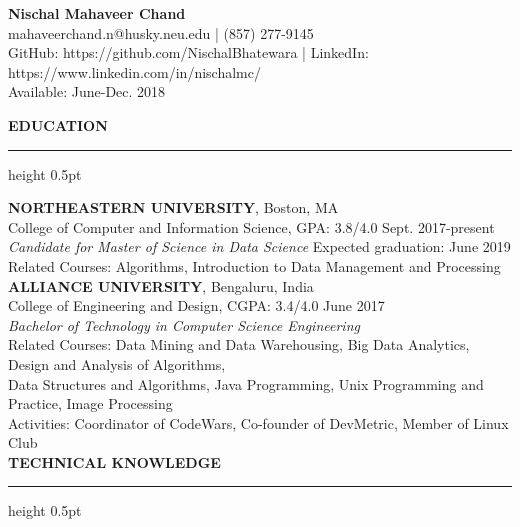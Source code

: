 \documentclass[a4paper]{article}
\newcommand{\myline}{\par
  \kern2pt %
  \hrule height 0.5pt
  \kern2pt %
}
\begin{document}
	\begin{center}
		{\Large \textbf{Nischal Mahaveer Chand}} \\
		mahaveerchand.n@husky.neu.edu | (857) 277-9145 \\
                GitHub: https://github.com/NischalBhatewara | 
                LinkedIn: https://www.linkedin.com/in/nischalmc/\\
		Available: June-Dec. 2018 \\
	\end{center}
	
	\noindent
	{\large \textbf{EDUCATION}}
	\myline 
	\smallskip
	
	\noindent
	\textbf{NORTHEASTERN UNIVERSITY}, Boston, MA \\
	\indent College of Computer and Information Science, GPA: 3.8/4.0 
        \hfill Sept. 2017-present \\
	\indent \textit{Candidate for Master of Science in Data Science} 
        \hfill Expected graduation: June 2019 \\
	\indent Related Courses: Algorithms, Introduction to Data Management and Processing \\
	
	\noindent
	\textbf{ALLIANCE UNIVERSITY}, Bengaluru, India \\
	\indent College of Engineering and Design, CGPA: 3.4/4.0 \hfill June 2017 \\
	\indent \textit{Bachelor of Technology in Computer Science Engineering} \\
	\indent Related Courses: 
                                    Data Mining and Data Warehousing,
                                    Big Data Analytics, 
                                    Design and Analysis of Algorithms, 
                                    \\ \hspace*{29.3mm}
                                    Data Structures and Algorithms, 
                                    Java Programming, 
                                    Unix Programming and Practice, 
                                    Image Processing
                                    \\
	\indent Activities: Coordinator of CodeWars, Co-founder of DevMetric, Member of Linux 
        Club \\
	
	\noindent
	{\large \textbf{TECHNICAL KNOWLEDGE}}
	\myline 
	
\end{document}
